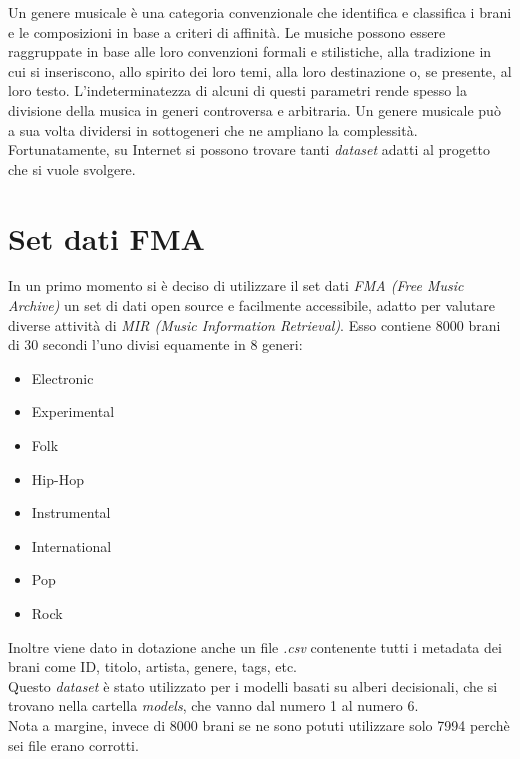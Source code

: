 Un genere musicale è una categoria convenzionale che identifica e classifica i brani e le composizioni in base a criteri di affinità. Le musiche possono essere raggruppate in base alle loro convenzioni formali e stilistiche, alla tradizione in cui si inseriscono, allo spirito dei loro temi, alla loro destinazione o, se presente, al loro testo. L'indeterminatezza di alcuni di questi parametri rende spesso la divisione della musica in generi controversa e arbitraria. Un genere musicale può a sua volta dividersi in sottogeneri che ne ampliano la complessità. Fortunatamente, su Internet si possono trovare tanti \textit{dataset} adatti al progetto che si vuole svolgere. 

\section{Set dati FMA}
In un primo momento si è deciso di utilizzare il set dati \textit{FMA (Free Music Archive)} un set di dati open source e facilmente accessibile, adatto per valutare diverse attività di \textit{MIR (Music Information Retrieval)}. Esso contiene 8000 brani di 30 secondi l'uno divisi equamente in 8 generi:
\begin{itemize}
	\item Electronic
	\item Experimental
	\item Folk
	\item Hip-Hop
	\item Instrumental
	\item International
	\item Pop
	\item Rock
\end{itemize}
Inoltre viene dato in dotazione anche un file \textit{.csv} contenente tutti i metadata dei brani come ID, titolo, artista, genere, tags, etc.\\
Questo \textit{dataset} è stato utilizzato per i modelli basati su alberi decisionali, che si trovano nella cartella \textit{models}, che vanno dal numero 1 al numero 6.\\
Nota a margine, invece di 8000 brani se ne sono potuti utilizzare solo 7994 perchè sei file erano corrotti.

